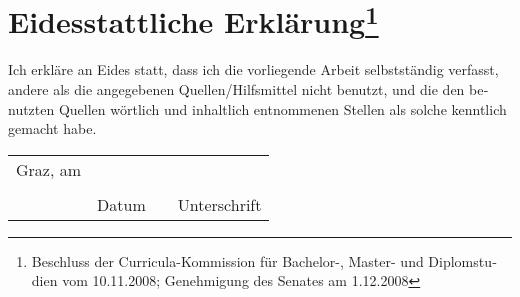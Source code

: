 

\newcommand{\mysignatureblock}[3]{%
  \begin{tabular}{llp{2em}l} 
  #1 & \hspace{5cm}        & & \hspace{6cm} \\\cline{2-2}\cline{4-4}
     &                     & & \\[-3mm]
     & {\footnotesize #2}  & & {\footnotesize #3}
  \end{tabular}
}

\section*{Eidesstattliche Erklärung\footnote{%
\foreignlanguage{ngerman}{Beschluss der Curricula-Kommission für Bachelor-, Master- und 
Diplomstudien vom 10.11.2008; 
Genehmigung des Senates am 1.12.2008}}}

\foreignlanguage{ngerman}{%
Ich erkläre an Eides statt, dass ich die
vorliegende Arbeit selbstständig verfasst, andere als die angegebenen
Quellen/Hilfsmittel nicht benutzt, und die den benutzten Quellen
wörtlich und inhaltlich entnommenen Stellen als solche kenntlich
gemacht habe.}

\vfill

\mysignatureblock{Graz, am}{Datum}{Unterschrift}


\newpage
\newpage

